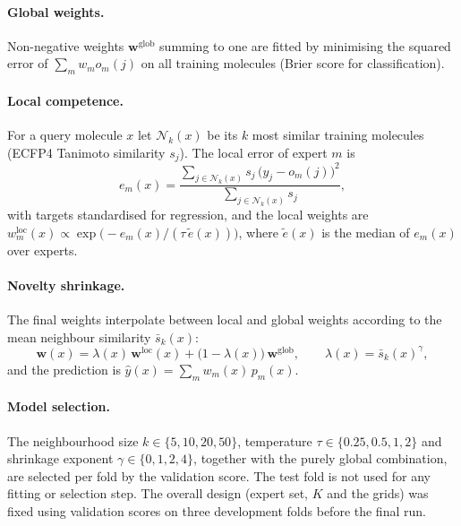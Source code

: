 \documentclass[journal=jcisd8,manuscript=article]{achemso}
\begin{document}
\paragraph{Global weights.} Non-negative weights $\mathbf{w}^{\mathrm{glob}}$ summing to one are fitted by minimising the squared error of $\sum_m w_m o_m(j)$ on all training molecules (Brier score for classification).

\paragraph{Local competence.} For a query molecule $x$ let $\mathcal{N}_k(x)$ be its $k$ most similar training molecules (ECFP4 Tanimoto similarity $s_j$). The local error of expert $m$ is
\begin{equation}
e_m(x) = \frac{\sum_{j \in \mathcal{N}_k(x)} s_j\,\bigl(y_j - o_m(j)\bigr)^2}{\sum_{j \in \mathcal{N}_k(x)} s_j},
\end{equation}
with targets standardised for regression, and the local weights are $w^{\mathrm{loc}}_m(x) \propto \exp\!\bigl(-e_m(x) / (\tau\,\tilde{e}(x))\bigr)$, where $\tilde{e}(x)$ is the median of $e_m(x)$ over experts.

\paragraph{Novelty shrinkage.} The final weights interpolate between local and global weights according to the mean neighbour similarity $\bar{s}_k(x)$:
\begin{equation}
\mathbf{w}(x) = \lambda(x)\,\mathbf{w}^{\mathrm{loc}}(x) + \bigl(1 - \lambda(x)\bigr)\,\mathbf{w}^{\mathrm{glob}}, \qquad \lambda(x) = \bar{s}_k(x)^{\gamma},
\end{equation}
and the prediction is $\hat{y}(x) = \sum_m w_m(x)\,p_m(x)$.

\paragraph{Model selection.} The neighbourhood size $k \in \{5, 10, 20, 50\}$, temperature $\tau \in \{0.25, 0.5, 1, 2\}$ and shrinkage exponent $\gamma \in \{0, 1, 2, 4\}$, together with the purely global combination, are selected per fold by the validation score. The test fold is not used for any fitting or selection step. The overall design (expert set, $K$ and the grids) was fixed using validation scores on three development folds before the final run.
\end{document}
